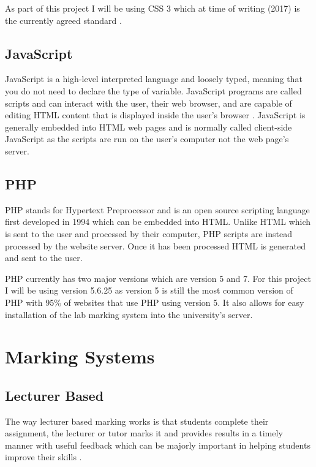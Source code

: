 \documentclass[11pt]{report}
\begin{document}
As part of this project I will be using CSS 3 which at time of writing (2017) is the currently agreed standard \cite{_css_????-1}.


\subsection{JavaScript}

JavaScript is a high-level interpreted language and loosely typed, meaning that you do not need to declare the type of variable. JavaScript programs are called scripts and can interact with the user, their web browser, and are capable of editing HTML content that is displayed inside the user's browser \cite{flanagan_javascript:_2006}. JavaScript is generally embedded into HTML web pages and is normally called client-side JavaScript as the scripts are run on the user's computer not the web page's server.



\subsection{PHP}
\label{sec:php}

PHP stands for Hypertext Preprocessor and is an open source scripting language first developed in 1994 \cite{_php:_????-1} which can be embedded into HTML. Unlike HTML which is sent to the user and processed by their computer, PHP scripts are instead processed by the website server. Once it has been processed HTML is generated and sent to the user. 

PHP currently has two major versions which are version 5 and 7. For this project I will be using version 5.6.25 as version 5 is still the most common version of PHP \cite{_usage_????} with 95\% of websites that use PHP using version 5. It also allows for easy installation of the lab marking system into the university's server.



\section{Marking Systems}

\subsection{Lecturer Based}
The way lecturer based marking works is that students complete their assignment, the lecturer or tutor marks it and provides results in a timely manner with useful feedback which can be majorly important in helping students improve their skills  \cite{tang_investigating_2011-5}.
\end{document}
